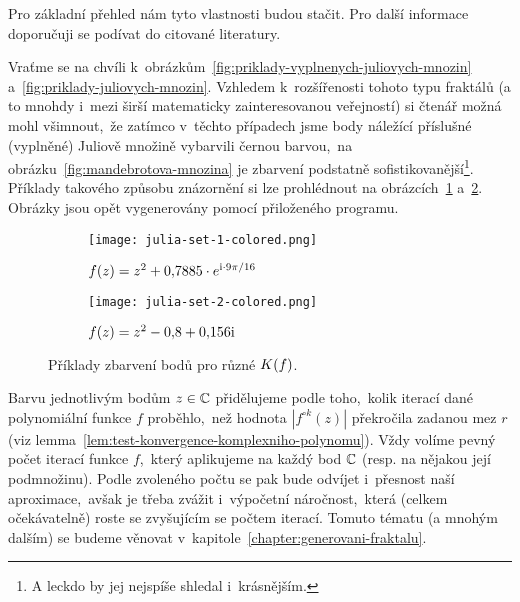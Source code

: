 Pro základní přehled nám tyto vlastnosti budou stačit. Pro další informace doporučuji se podívat do citované literatury.

Vraťme se na chvíli k~obrázkům~\ref{fig:priklady-vyplnenych-juliovych-mnozin} a~\ref{fig:priklady-juliovych-mnozin}. Vzhledem k~rozšířenosti tohoto typu fraktálů (a to mnohdy i~mezi širší matematicky zainteresovanou veřejností) si čtenář možná mohl všimnout,~že zatímco v~těchto případech jsme body náležící příslušné (vyplněné) Juliově množině vybarvili černou barvou,~na obrázku~\ref{fig:mandebrotova-mnozina} je zbarvení podstatně sofistikovanější\footnote{A leckdo by jej nejspíše shledal i~krásnějším.}. Příklady takového způsobu znázornění si lze prohlédnout na obrázcích~\ref{subfig:vyplnena-juliova-mnozina-1-obarveno} a~\ref{subfig:vyplnena-juliova-mnozina-2-obarveno}. Obrázky jsou opět vygenerovány pomocí přiloženého programu.
\begin{figure}[h]
    \centering
    \begin{subfigure}{0.48\textwidth}
        \centering
        \texttt{[image: julia-set-1-colored.png]}
        \caption{$f(z)=z^2 + 0{,}7885\cdot e^{\textrm{i}\cdot9\pi/16}$}
        \label{subfig:vyplnena-juliova-mnozina-1-obarveno}
    \end{subfigure}
    \quad
    \begin{subfigure}{0.48\textwidth}
        \centering
        \texttt{[image: julia-set-2-colored.png]}
        \caption{$f(z)=z^2 - 0{,}8 + 0{,}156\textrm{i}$}
        \label{subfig:vyplnena-juliova-mnozina-2-obarveno}
    \end{subfigure}
    \caption{Příklady zbarvení bodů pro různé $K(f)$.}
    \label{fig:priklady-vyplnenych-juliovych-mnozin-obarveno}
\end{figure}

Barvu jednotlivým bodům $z\in\mathbb{C}$ přidělujeme podle toho,~kolik iterací dané polynomiální funkce $f$ proběhlo,~než hodnota $|f^{\circ k}(z)|$ překročila zadanou mez $r$ (viz lemma~\ref{lem:test-konvergence-komplexniho-polynomu}). Vždy volíme pevný počet iterací funkce $f$,~který aplikujeme na každý bod $\mathbb{C}$ (resp. na nějakou její podmnožinu). Podle zvoleného počtu se pak bude odvíjet i~přesnost naší aproximace,~avšak je třeba zvážit i~výpočetní náročnost,~která (celkem očekávatelně) roste se zvyšujícím se počtem iterací. Tomuto tématu (a mnohým dalším) se budeme věnovat v~kapitole~\ref{chapter:generovani-fraktalu}.
 

